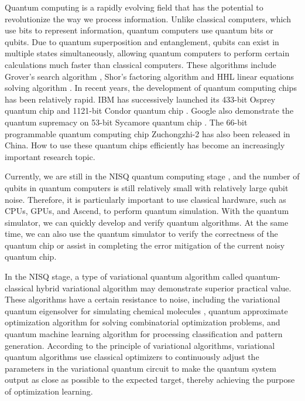 Quantum computing is a rapidly evolving field that has the potential to revolutionize the way we process information. Unlike classical computers, which use bits to represent information, quantum computers use quantum bits or qubits. Due to quantum superposition and entanglement, qubits can exist in multiple states simultaneously, allowing quantum computers to perform certain calculations much faster than classical computers. These algorithms include Grover's search algorithm \cite{grover1996fast, long2001grover}, Shor's factoring algorithm \cite{shor1994algorithms} and HHL linear equations solving algorithm \cite{harrow2009quantum}. In recent years, the development of quantum computing chips has been relatively rapid. IBM has successively launched its 433-bit Osprey quantum chip \cite{ibm2022osprey} and 1121-bit Condor quantum chip \cite{castelvecchi2023ibm}. Google also demonstrate the quantum supremacy on 53-bit Sycamore quantum chip \cite{arute2019quantum}. The 66-bit programmable quantum computing chip Zuchongzhi-2 \cite{wu2021strong} has also been released in China. How to use these quantum chips efficiently has become an increasingly important research topic.

Currently, we are still in the NISQ quantum computing stage \cite{preskill2018quantum}, and the number of qubits in quantum computers is still relatively small with relatively large qubit noise. Therefore, it is particularly important to use classical hardware, such as CPUs, GPUs, and Ascend, to perform quantum simulation. With the quantum simulator, we can quickly develop and verify quantum algorithms. At the same time, we can also use the quantum simulator to verify the correctness of the quantum chip or assist in completing the error mitigation of the current noisy quantum chip.

In the NISQ stage, a type of variational quantum algorithm \cite{Peruzzo2014Peruzzo2014,cerezo2021variational} called quantum-classical hybrid variational algorithm may demonstrate superior practical value. These algorithms have a certain resistance to noise, including the variational quantum eigensolver for simulating chemical molecules \cite{mcardle2020quantum,cao2019quantum,yeter2020practical,fan2023circuit}, quantum approximate optimization algorithm \cite{farhi2014quantum,PhysRevResearch.4.013141} for solving combinatorial optimization problems, and quantum machine learning algorithm \cite{benedetti2019parameterized,biamonte2017quantum,das2019machine} for processing classification and pattern generation. According to the principle of variational algorithms, variational quantum algorithms use classical optimizers to continuously adjust the parameters in the variational quantum circuit to make the quantum system output as close as possible to the expected target, thereby achieving the purpose of optimization learning.

